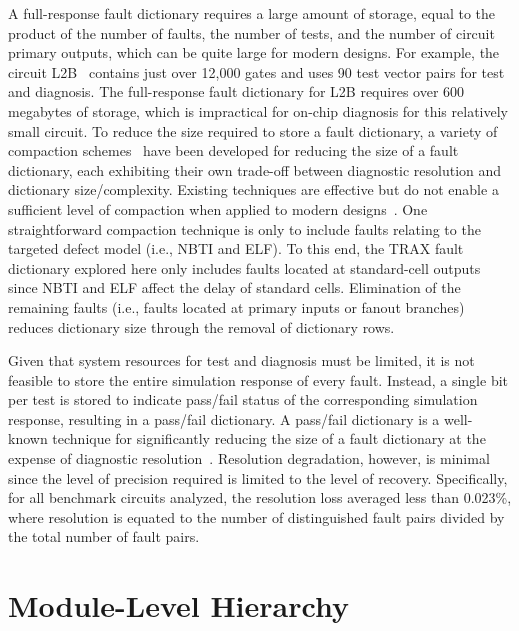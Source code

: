 A full-response fault dictionary requires a large amount of storage, equal to the product of the number of faults, the number of tests, and the number of circuit primary outputs, which can be quite large for modern designs.
%
For example, the circuit L2B~\cite{sun11} contains just over 12,000 gates and uses 90 test vector pairs for test and diagnosis.
%
The full-response fault dictionary for L2B requires over 600 megabytes of storage, which is impractical for on-chip diagnosis for this relatively small circuit.
%
To reduce the size required to store a fault dictionary, a variety of compaction schemes~\cite{arslan02, bernardi06, boppana94, chakravarty99, boppana96, chess99, hong07, pomeranz92} have been developed for reducing the size of a fault dictionary, each exhibiting their own trade-off between diagnostic resolution and dictionary size/complexity.
%
Existing techniques are effective but do not enable a sufficient level of compaction when applied to modern designs~\cite{ryan93, boppana94}.
%
One straightforward compaction technique is only to include faults relating to the targeted defect model (i.e., NBTI and ELF).
%
To this end, the TRAX fault dictionary explored here only includes faults located at standard-cell outputs since NBTI and ELF affect the delay of standard cells.
%
Elimination of the remaining faults (i.e., faults located at primary inputs or fanout branches) reduces dictionary size through the removal of dictionary rows.

Given that system resources for test and diagnosis must be limited, it is not feasible to store the entire simulation response of every fault.
%
Instead, a single bit per test is stored to indicate pass/fail status of the corresponding simulation response, resulting in a pass/fail dictionary.
%
A pass/fail dictionary is a well-known technique for significantly reducing the size of a fault dictionary at the expense of diagnostic resolution~\cite{pomeranz92}.
%
Resolution degradation, however, is minimal since the level of precision required is limited to the level of recovery.
%
Specifically, for all benchmark circuits analyzed, the resolution loss averaged less than 0.023\%, where resolution is equated to the number of distinguished fault pairs divided by the total number of fault pairs.

\section{Module-Level Hierarchy}
\label{sec:dict_mod_level_hier}

